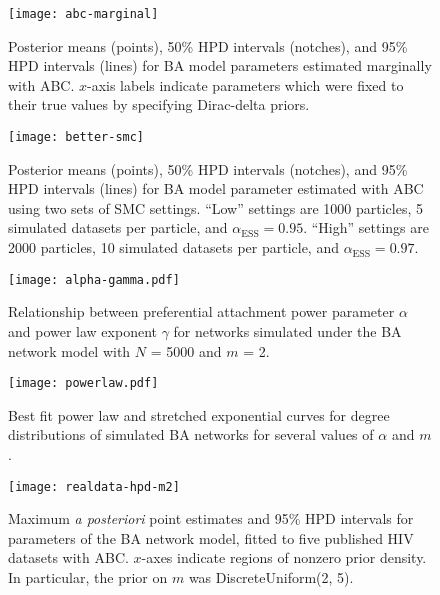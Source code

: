 \documentclass[12pt]{article}\usepackage[]{graphicx}\usepackage[]{color}
\begin{document}
\begin{figure}
    \texttt{[image: abc-marginal]}
    \caption[
        Posterior means, 50\% HPD intervals, and 95\% HPD intervals for BA
        model parameters estimated marginally with ABC.
    ]{
        Posterior means (points), 50\% HPD intervals (notches), and 95\% HPD
        intervals (lines) for BA model parameters estimated marginally with
        ABC. $x$-axis labels indicate parameters which were fixed to their true
        values by specifying Dirac-delta priors.
    }
    \label{fig:marginal}
\end{figure}

\begin{figure}
    \centering
    \texttt{[image: better-smc]}
    \caption[
        Posterior means, 50\% HPD intervals, and 95\% HPD intervals for BA
        model parameters estimated with ABC using two sets of SMC settings.
    ]{
        Posterior means (points), 50\% HPD intervals (notches), and 95\% HPD
        intervals (lines) for BA model parameter estimated with ABC using two
        sets of SMC settings. ``Low'' settings are 1000 particles, 5 simulated
        datasets per particle, and $\alpha_{\text{ESS}} = 0.95$. ``High''
        settings are 2000 particles, 10 simulated datasets per particle, and
        $\alpha_{\text{ESS}} = 0.97.$
    }
    \label{fig:better}
\end{figure}

\begin{figure}[ht]
  \centering
  \texttt{[image: alpha-gamma.pdf]}
  \caption{
      Relationship between preferential attachment power parameter $\alpha$
      and power law exponent $\gamma$ for networks simulated under the BA
      network model with $N$ = 5000 and $m$ = 2.
  }
  \label{fig:gamma}
\end{figure}

\begin{figure}[ht]
    \centering
    \texttt{[image: powerlaw.pdf]}
    \caption{
        Best fit power law and stretched exponential curves for degree
        distributions of simulated BA networks for several values of $\alpha$
        and $m$.
    }
    \label{fig:powerlaw}
\end{figure}

\begin{figure}[ht]
  \texttt{[image: realdata-hpd-m2]}
  \vspace{8pt}
  \caption{
      Maximum \textit{a posteriori} point estimates and 95\% HPD intervals for
      parameters of the BA network model, fitted to five published HIV datasets
      with ABC. $x$-axes indicate regions of nonzero prior density. In
      particular, the prior on $m$ was DiscreteUniform(2, 5).
  }
  \label{fig:abchpdm2}
\end{figure}
\end{document}
